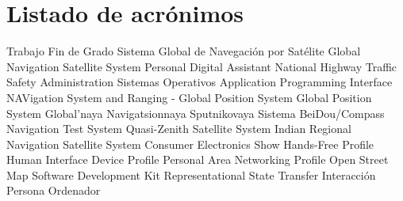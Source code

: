 \chapter{Listado de acrónimos}

{\small
\begin{acronym}[XXXXXXXX]
       {Trabajo Fin de Grado}
      {Sistema Global de Navegación por Satélite}
      {Global Navigation Satellite System}
       {Personal Digital Assistant}
     {National Highway Traffic Safety Administration}
        {Sistemas Operativos}
       {Application Programming Interface}
   {NAVigation System and Ranging - Global Position System}
       {Global Position System}
   {Global'naya Navigatsionnaya Sputnikovaya Sistema}
      {BeiDou/Compass Navigation Test System}
      {Quasi-Zenith Satellite System} 
     {Indian Regional Navigation Satellite System}
       {Consumer Electronics Show}
       {Hands-Free Profile}
       {Human Interface Device Profile}
       {Personal Area Networking Profile}
       {Open Street Map}
       {Software Development Kit}
      {Representational State Transfer}
       {Interacción Persona Ordenador}
\end{acronym}
}





